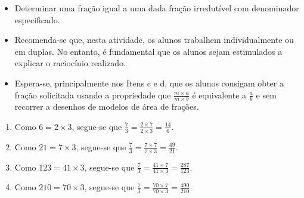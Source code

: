 \begin{atividade}\label{chap4-ativ9}
\objetivos
\begin{itemize} %
    \item       Determinar uma fração igual a uma dada fração irredutível com
denominador especificado.
\end{itemize} %

\discussoes
\begin{itemize} %
    \item       Recomenda-se que, nesta atividade, os alunos trabalhem
individualmente ou em duplas. No entanto, é fundamental que os alunos sejam
estimulados a explicar o raciocínio realizado.
    \item       Espera-se, principalmente nos Itens c e d, que os alunos
consigam obter a fração solicitada usando a propriedade que       $\frac{m
\times a}{m \times b}$       é equivalente a       $\frac{a}{b}$       e sem
recorrer a desenhos de modelos de área de frações.
\end{itemize} %

\solucao
\begin{enumerate} %
    \item       Como       $6 = 2 \times 3$, segue-se que       $\frac{7}{3} =
\frac{2 \times 7}{2 \times 3} = \frac{14}{6}$.
    \item       Como       $21 = 7 \times 3$, segue-se que       $\frac{7}{3} =
\frac{7 \times 7}{7 \times 3} = \frac{49}{21}$.
    \item       Como       $123 = 41 \times 3$, segue-se que       $\frac{7}{3}
= \frac{41 \times 7}{41 \times 3} = \frac{287}{123}$.
    \item       Como       $210 = 70 \times 3$, segue-se que       $\frac{7}{3}
= \frac{70 \times 7}{70 \times 3} = \frac{490}{210}$.
\end{enumerate} %

\end{atividade}

